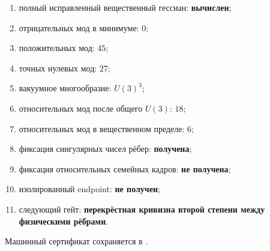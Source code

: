 \begin{protocol}
\begin{enumerate}
 \item полный исправленный вещественный гессиан: \textbf{вычислен};
 \item отрицательных мод в минимуме: \textbf{$0$};
 \item положительных мод: \textbf{$45$};
 \item точных нулевых мод: \textbf{$27$};
 \item вакуумное многообразие: \textbf{$U(3)^3$};
 \item относительных мод после общего $U(3)$: \textbf{$18$};
 \item относительных мод в вещественном пределе: \textbf{$6$};
 \item фиксация сингулярных чисел рёбер: \textbf{получена};
 \item фиксация относительных семейных кадров: \textbf{не получена};
 \item изолированный endpoint: \textbf{не получен};
 \item следующий гейт: \textbf{перекрёстная кривизна второй степени между
 физическими рёбрами}.
\end{enumerate}
\end{protocol}

Машинный сертификат сохраняется в
.
